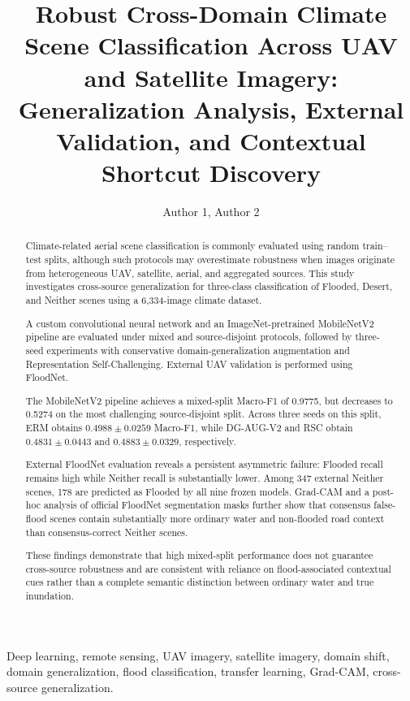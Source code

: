 \documentclass[journal]{IEEEtran}
\title{
Robust Cross-Domain Climate Scene Classification Across UAV and
Satellite Imagery: Generalization Analysis, External Validation,
and Contextual Shortcut Discovery
}
\author{
Author 1,
Author 2
}
\begin{document}
\raggedbottom

\maketitle

\begin{abstract}
Climate-related aerial scene classification is commonly evaluated
using random train--test splits, although such protocols may
overestimate robustness when images originate from heterogeneous UAV,
satellite, aerial, and aggregated sources. This study investigates
cross-source generalization for three-class classification of Flooded,
Desert, and Neither scenes using a 6,334-image climate dataset.

A custom convolutional neural network and an ImageNet-pretrained
MobileNetV2 pipeline are evaluated under mixed and source-disjoint
protocols, followed by three-seed experiments with conservative
domain-generalization augmentation and Representation
Self-Challenging. External UAV validation is performed using FloodNet.

The MobileNetV2 pipeline achieves a mixed-split Macro-F1 of 0.9775,
but decreases to 0.5274 on the most challenging source-disjoint split.
Across three seeds on this split, ERM obtains
$0.4988\pm0.0259$ Macro-F1, while DG-AUG-V2 and RSC obtain
$0.4831\pm0.0443$ and $0.4883\pm0.0329$, respectively.

External FloodNet evaluation reveals a persistent asymmetric failure:
Flooded recall remains high while Neither recall is substantially
lower. Among 347 external Neither scenes, 178 are predicted as
Flooded by all nine frozen models. Grad-CAM and a post-hoc analysis
of official FloodNet segmentation masks further show that consensus
false-flood scenes contain substantially more ordinary water and
non-flooded road context than consensus-correct Neither scenes.

These findings demonstrate that high mixed-split performance does not
guarantee cross-source robustness and are consistent with reliance on
flood-associated contextual cues rather than a complete semantic
distinction between ordinary water and true inundation.
\end{abstract}

\begin{IEEEkeywords}
Deep learning,
remote sensing,
UAV imagery,
satellite imagery,
domain shift,
domain generalization,
flood classification,
transfer learning,
Grad-CAM,
cross-source generalization.
\end{IEEEkeywords}














\end{document}
